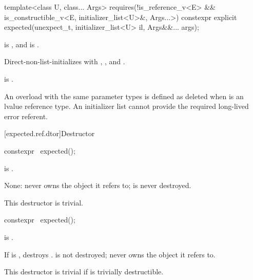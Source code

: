%
\begin{itemdecl}
template<class U, class... Args>
  requires(!is_reference_v<E> && is_constructible_v<E, initializer_list<U>&, Args...>)
constexpr explicit expected(unexpect_t, initializer_list<U> il, Args&&... args);
\end{itemdecl}

\begin{itemdescr}
\pnum
\constraints
{} is , and  is .

\pnum
\effects
Direct-non-list-initializes  with , , and .

\pnum
\ensures
{} is .

\pnum
\remarks
An overload with the same parameter types is defined as deleted when  is an lvalue reference type. An initializer list cannot provide the required long-lived error referent.
\end{itemdescr}

[expected.ref.dtor]{Destructor}

%
\begin{itemdecl}
constexpr ~expected();
\end{itemdecl}

\begin{itemdescr}
\pnum
\constraints
{} is .

\pnum
\effects
None:  never owns the object it refers to;  is never destroyed.

\pnum
\remarks
This destructor is trivial.
\end{itemdescr}

%
\begin{itemdecl}
constexpr ~expected();
\end{itemdecl}

\begin{itemdescr}
\pnum
\constraints
{} is .

\pnum
\effects
If  is , destroys .  is not destroyed;  never owns the object it refers to.

\pnum
\remarks
This destructor is trivial if  is trivially destructible.
\end{itemdescr}

